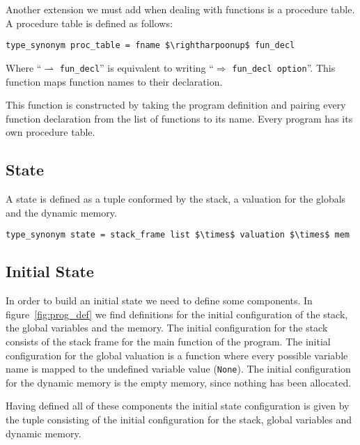 Another extension we must add when dealing with functions is a procedure table.
A procedure table is defined as follows:

\begin{lstlisting}[mathescape=true, frame=single]
type_synonym proc_table = fname $\rightharpoonup$ fun_decl
\end{lstlisting}

Where ``$\rightharpoonup$ \verb|fun_decl|'' is equivalent to writing ``$\Rightarrow$ \verb|fun_decl option|''.
This function maps function names to their declaration.

This function is constructed by taking the program definition and pairing every function declaration from the list of functions to its name.
Every program has its own procedure table.


\subsection{State}\label{subsection:state}

A state is defined as a tuple conformed by the stack, a valuation for the globals and the dynamic memory.

\begin{lstlisting}[mathescape=true, frame=single]
type_synonym state = stack_frame list $\times$ valuation $\times$ mem
\end{lstlisting}

\subsection{Initial State}\label{subsection:initial_state}

In order to build an initial state we need to define some components.
In figure~\ref{fig:prog_def} we find definitions for the initial configuration of the stack, the global variables and the memory.
The initial configuration for the stack consists of the stack frame for the main function of the program.
The initial configuration for the global valuation is a function where every possible variable name is mapped to the undefined variable value (\verb|None|).
The initial configuration for the dynamic memory is the empty memory, since nothing has been allocated.

Having defined all of these components the initial state configuration is given by the tuple consisting of the initial configuration for the stack, global variables and dynamic memory.


